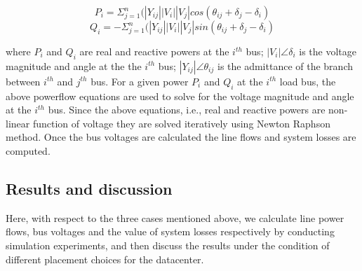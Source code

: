 \begin{equation}
P_{i} = \Sigma_{j=1}^{n}(|Y_{ij}||V_{i}||V_{j}|cos(\theta_{ij}+\delta_{j}-\delta_{i})
\end{equation}
\begin{equation}
Q_{i} = -\Sigma_{j=1}^{n}(|Y_{ij}||V_{i}||V_{j}|sin(\theta_{ij}+\delta_{j}-\delta_{i})
\end{equation}

\noindent where $P_{i}$ and $Q_{i}$ are real and reactive powers at the $i^{th}$ bus; $|V_{i}| \angle \delta_{i}$ is the voltage magnitude and angle at the the $i^{th}$ bus; $|Y_{ij}| \angle \theta_{ij}$ is the admittance of the branch between $i^{th}$ and $j^{th}$ bus.  For a given power $P_{i}$ and $Q_{i}$ at the $i^{th}$ load bus, the above powerflow equations are used to solve for the voltage magnitude and angle at the $i^{th}$ bus. Since the above equations, i.e., real and reactive powers are non-linear function of voltage they are solved iteratively using Newton Raphson method. Once the bus voltages are calculated the line flows and system losses are computed.  \subsection{Results and discussion}

Here, with respect to the three cases mentioned above, we calculate line power flows, bus voltages and the value of system losses respectively by conducting simulation experiments, and then discuss the results under the condition of different placement choices for the datacenter.

